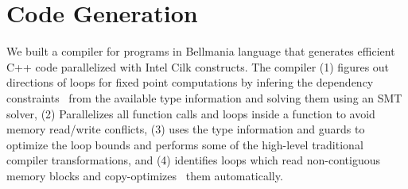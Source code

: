 \section{Code Generation}
\label{codegen}

We built a compiler for programs in Bellmania language that generates efficient C++ code parallelized with Intel Cilk constructs. The compiler (1) figures out directions of loops for fixed point computations by infering the dependency constraints~\cite{JACM1967} from the available type information and solving them using an SMT solver, (2) Parallelizes all function calls and loops inside a function to avoid memory read/write conflicts, (3) uses the type information and guards to optimize the loop bounds and performs some of the high-level traditional compiler transformations, and (4) identifies  loops which read non-contiguous memory blocks and copy-optimizes~\cite{ASPLOS1991} them automatically.  

 


